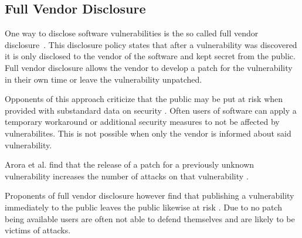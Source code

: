 \subsection{Full Vendor Disclosure}
\label{sec:full-vendor}

One way to disclose software vulnerabilities is the so called full vendor disclosure~\cite{Cavusoglu2007}.
This disclosure policy states that after a vulnerability was discovered it is only disclosed to the vendor of the software and kept secret from the public.
Full vendor disclosure allows the vendor to develop a patch for the vulnerability in their own time or leave the vulnerability unpatched.

Opponents of this approach criticize that the public may be put at risk when provided with substandard data on security \cite{Cavusoglu2007}.
Often users of software can apply a temporary workaround or additional security measures to not be affected by vulnerabilites.
This is not possible when only the vendor is informed about said vulnerability.

Arora et al. find that the release of a patch for a previously unknown vulnerability increases the number of attacks on that vulnerability \cite{Arora2004}.

Proponents of full vendor disclosure however find that publishing a vulnerability immediately to the public leaves the public likewise at risk \cite{Arora2004}.
Due to no patch being available users are often not able to defend themselves and are likely to be victims of attacks. 